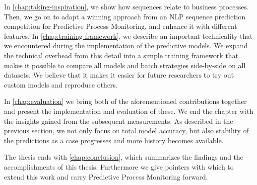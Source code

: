In \autoref{chap:taking-inspiration}, we show how sequences relate to business processes. Then, we go on to adapt a winning approach from an NLP sequence prediction competition for Predictive Process Monitoring, and enhance it with different features. In \autoref{chap:training-framework}, we describe an important technicality that we encountered during the implementation of the predictive models. We expand the technical overhead from this detail into a simple training framework that makes it possible to compare all models and batch strategies side-by-side on all datasets. We believe that it makes it easier for future researchers to try out custom models and reproduce others.

In \autoref{chap:evaluation} we bring both of the aforementioned contributions together and present the implementation and evaluation of these. We end the chapter with the insights gained from the subsequent measurements. As described in the previous section, we not only focus on total model accuracy, but also stability of the predictions as a case progresses and more history becomes available.

The thesis ends with \autoref{chap:conclusion}, which summarizes the findings and the accomplishments of this thesis. Furthermore we give pointers with which to extend this work and carry Predictive Process Monitoring forward.